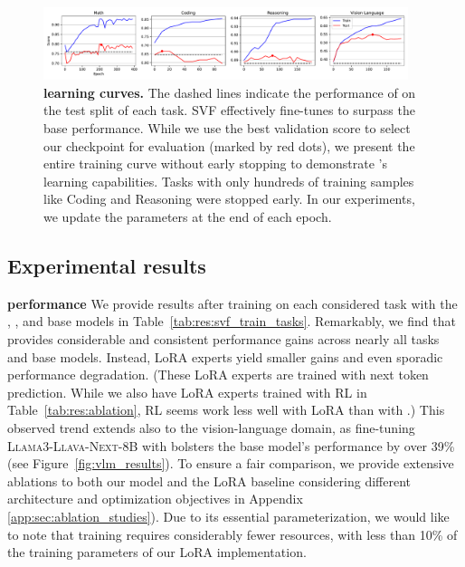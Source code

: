 \begin{figure}[!t]
    \centering
    \includegraphics[width=0.95\textwidth]{images/learning_curves_new.pdf}
    \vspace{-4mm}
    \caption{\textbf{\svdacro learning curves.} The dashed lines indicate the performance of \llama on the test split of each task. SVF effectively fine-tunes to surpass the base performance. While we use the best validation score to select our checkpoint for evaluation (marked by red dots), we present the entire training curve without early stopping to demonstrate \svdacro's learning capabilities. Tasks with only hundreds of training samples like Coding and Reasoning were stopped early. In our experiments, we update the parameters at the end of each epoch.}
    \vspace{-6mm}
    \label{fig:learning_curves}
\end{figure}


\subsection{Experimental results}



\textbf{\svdacro performance}
We provide results after training on each considered task with the \llama, \mistral, and \llamaXL base models in Table~\ref{tab:res:svf_train_tasks}.
Remarkably, we find that \svdacro provides considerable and consistent performance gains across nearly all tasks and base models. Instead, LoRA experts yield smaller gains and even sporadic performance degradation.
(These LoRA experts are trained with next token prediction. While we also have LoRA experts trained with RL in Table~\ref{tab:res:ablation}, RL seems work less well with LoRA than with \svdacro.)
This observed trend extends also to the vision-language domain, as fine-tuning \textsc{Llama3-Llava-Next-8B} with \svdacro bolsters the base model's performance by over 39\% (see Figure~\ref{fig:vlm_results}).
To ensure a fair comparison, we provide extensive ablations to both our model and the LoRA baseline considering different architecture and optimization objectives in Appendix~ \ref{app:sec:ablation_studies}).
Due to its essential parameterization, we would like to note that training \svdacro requires considerably fewer resources, with less than 10\% of the training parameters of our LoRA implementation.

